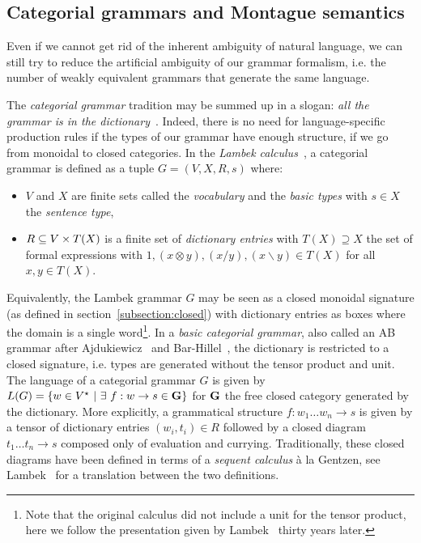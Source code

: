 
\subsection{Categorial grammars and Montague semantics}

Even if we cannot get rid of the inherent ambiguity of natural language, we can still try to reduce the artificial ambiguity of our grammar formalism, i.e. the number of weakly equivalent grammars that generate the same language.

The \emph{categorial grammar} tradition may be summed up in a slogan: \emph{all the grammar is in the dictionary}~\cite{Preller07}.
Indeed, there is no need for language-specific production rules if the types of our grammar have enough structure, if we go from monoidal to closed categories.
In the \emph{Lambek calculus}~\cite{Lambek58}, a categorial grammar is defined as a tuple $G = (V, X, R, s)$ where:
\begin{itemize}
\item $V$ and $X$ are finite sets called the \emph{vocabulary} and the \emph{basic types} with $s \in X$ the \emph{sentence type},
\item $R \subseteq V \times T(X)$ is a finite set of \emph{dictionary entries} with $T(X) \supseteq X$ the set of formal expressions with $1, (x \otimes y), (x / y), (x \backslash y) \in T(X)$ for all $x, y \in T(X)$.
\end{itemize}
Equivalently, the Lambek grammar $G$ may be seen as a closed monoidal signature (as defined in section~\ref{subsection:closed}) with dictionary entries as boxes where the domain is a single word\footnote
{Note that the original calculus did not include a unit for the tensor product, here we follow the presentation given by Lambek~\cite{Lambek88} thirty years later.}.
In a \emph{basic categorial grammar}, also called an AB grammar after Ajdukiewicz~\cite{Ajdukiewicz35} and Bar-Hillel~\cite{Bar-Hillel54}, the dictionary is restricted to a closed signature, i.e. types are generated without the tensor product and unit.
The language of a categorial grammar $G$ is given by $L(G) = \{ w \in V^\star \ \vert \ \exists \ f : w \to s \in \G \}$ for $\mathbf{G}$ the free closed category generated by the dictionary.
More explicitly, a grammatical structure $f : w_1 \dots w_n \to s$ is given by a tensor of dictionary entries $(w_i, t_i) \in R$ followed by a closed diagram $t_1 \dots t_n \to s$ composed only of evaluation and currying.
Traditionally, these closed diagrams have been defined in terms of a \emph{sequent calculus} à la Gentzen, see Lambek~\cite{Lambek88} for a translation between the two definitions.


